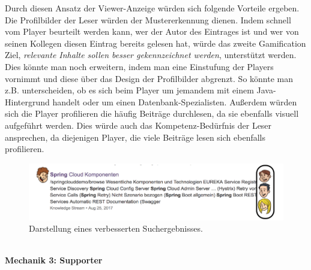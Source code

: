 \documentclass[a4paper,12pt,twoside]{scrartcl}
\begin{document}
Durch diesen Ansatz der Viewer-Anzeige würden sich folgende Vorteile ergeben. Die Profilbilder der Leser würden der Mustererkennung dienen. Indem schnell vom Player beurteilt werden kann, wer der Autor des Eintrages ist und wer von seinen Kollegen diesen Eintrag bereits gelesen hat, würde das zweite Gamification Ziel, \textit{relevante Inhalte sollen besser gekennzeichnet werden}, unterstützt werden. Dies könnte man noch erweitern, indem man eine Einstufung der Players vornimmt und diese über das Design der Profilbilder abgrenzt. So könnte man z.B. unterscheiden, ob es sich beim Player um jemandem mit einem Java-Hintergrund handelt oder um einen Datenbank-Spezialisten. Außerdem würden sich die Player profilieren die häufig Beiträge durchlesen, da sie ebenfalls visuell aufgeführt werden. Dies würde auch das Kompetenz-Bedürfnis der Leser ansprechen, da diejenigen Player, die viele Beiträge lesen sich ebenfalls profilieren.
\\
\begin{figure}[h!]
\begin{center}
\includegraphics[scale = 0.5]{Bilder/NeueSuchErgebnisse.png}
\caption{Darstellung eines verbesserten Suchergebnisses.}
\label{NeueSuchErgebnisse}
\end{center}
\end{figure}
\\
\textbf{Mechanik 3: Supporter}\\
\end{document}
